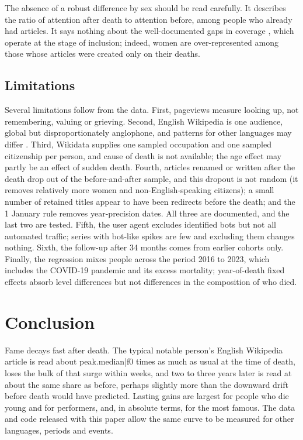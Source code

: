\documentclass[11pt,a4paper]{article}
\begin{document}
The absence of a robust difference by sex should be read carefully. It describes the ratio of attention after death to attention before, among people who already had articles. It says nothing about the well-documented gaps in coverage \citep{wagner2015,wagner2016,konieczny2018}, which operate at the stage of inclusion; indeed, women are over-represented among those whose articles were created only on their deaths.

\subsection{Limitations}
Several limitations follow from the data. First, pageviews measure looking up, not remembering, valuing or grieving. Second, English Wikipedia is one audience, global but disproportionately anglophone, and patterns for other languages may differ \citep{lemmerich2019}. Third, Wikidata supplies one sampled occupation and one sampled citizenship per person, and cause of death is not available; the age effect may partly be an effect of sudden death. Fourth, articles renamed or written after the death drop out of the before-and-after sample, and this dropout is not random (it removes relatively more women and non-English-speaking citizens); a small number of retained titles appear to have been redirects before the death; and the 1 January rule removes year-precision dates. All three are documented, and the last two are tested. Fifth, the user agent excludes identified bots but not all automated traffic; series with bot-like spikes are few and excluding them changes nothing. Sixth, the follow-up after 34 months comes from earlier cohorts only. Finally, the regression mixes people across the period 2016 to 2023, which includes the COVID-19 pandemic and its excess mortality; year-of-death fixed effects absorb level differences but not differences in the composition of who died.

\section{Conclusion}
Fame decays fast after death. The typical notable person's English Wikipedia article is read about {{peak.median|f0}} times as much as usual at the time of death, loses the bulk of that surge within weeks, and two to three years later is read at about the same share as before, perhaps slightly more than the downward drift before death would have predicted. Lasting gains are largest for people who die young and for performers, and, in absolute terms, for the most famous. The data and code released with this paper allow the same curve to be measured for other languages, periods and events.
\end{document}
